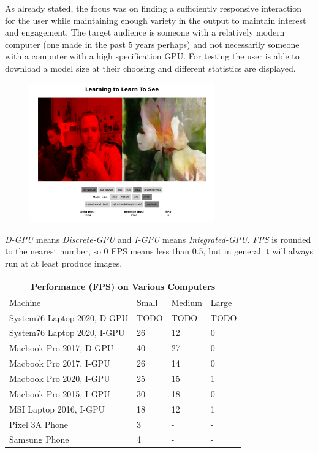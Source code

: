 \documentclass[a4paper]{article}
\begin{document}
As already stated, the focus was on finding a sufficiently responsive interaction for the user while maintaining enough variety in the output to maintain interest and engagement. The target audience is someone with a relatively modern computer (one made in the past 5 years perhaps) and not necessarily someone with a computer with a high specification GPU. For testing the user is able to download a model size at their choosing and different statistics are displayed.

\begin{figure}
	\includegraphics[width=8cm]{ltlts_online}
	\centering
\end{figure}

\textit{D-GPU} means \textit{Discrete-GPU} and \textit{I-GPU} means \textit{Integrated-GPU}. \textit{FPS} is rounded to the nearest number, so 0 FPS means less than 0.5, but in general it will always run at at least produce images.

\begin{small}
	\begin{center}
		\begin{tabular}{p{5cm} p{1.5cm} p{1.5cm} p{1.5cm}}
			\hline
			\multicolumn{4}{c}{Performance (FPS) on Various Computers} \\
			\hline
			Machine                     & Small & Medium & Large       \\
			\hline
			System76 Laptop 2020, D-GPU & TODO  & TODO   & TODO        \\
			System76 Laptop 2020, I-GPU & 26    & 12     & 0           \\
			Macbook Pro 2017, D-GPU     & 40    & 27     & 0           \\
			Macbook Pro 2017, I-GPU     & 26    & 14     & 0           \\
			Macbook Pro 2020, I-GPU     & 25    & 15     & 1           \\
			Macbook Pro 2015, I-GPU     & 30    & 18     & 0           \\
			MSI Laptop 2016, I-GPU      & 18    & 12     & 1           \\
			Pixel 3A Phone              & 3     & -      & -           \\
			Samsung Phone               & 4     & -      & -           \\
			\hline
		\end{tabular}
	\end{center}
\end{small}
\end{document}
